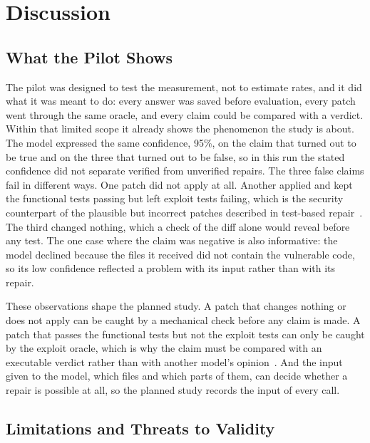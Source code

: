 \documentclass[ai,article,submit,oneauthor]{Definitions/mdpi}
\begin{document}
\section{Discussion}\label{sec:discussion}

\subsection{What the Pilot Shows}

The pilot was designed to test the measurement, not to estimate rates, and it did what it was meant to do: every answer was saved before evaluation, every patch went through the same oracle, and every claim could be compared with a verdict. Within that limited scope it already shows the phenomenon the study is about. The model expressed the same confidence, 95\%, on the claim that turned out to be true and on the three that turned out to be false, so in this run the stated confidence did not separate verified from unverified repairs. The three false claims fail in different ways. One patch did not apply at all. Another applied and kept the functional tests passing but left exploit tests failing, which is the security counterpart of the plausible but incorrect patches described in test-based repair~\cite{Qi2015AnalysisOfPatch,Smith2015IsTheCure}. The third changed nothing, which a check of the diff alone would reveal before any test. The one case where the claim was negative is also informative: the model declined because the files it received did not contain the vulnerable code, so its low confidence reflected a problem with its input rather than with its repair.

These observations shape the planned study. A patch that changes nothing or does not apply can be caught by a mechanical check before any claim is made. A patch that passes the functional tests but not the exploit tests can only be caught by the exploit oracle, which is why the claim must be compared with an executable verdict rather than with another model's opinion~\cite{Huang2024LargeLanguageModels,Zheng2023JudgingLlmAs}. And the input given to the model, which files and which parts of them, can decide whether a repair is possible at all, so the planned study records the input of every call.

\subsection{Limitations and Threats to Validity}\label{sec:limits}
\end{document}
